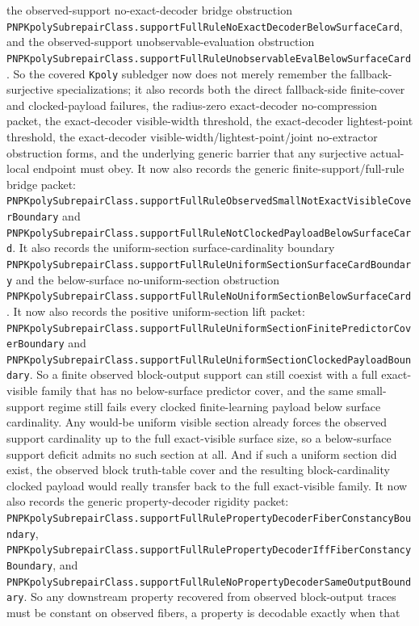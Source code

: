\documentclass[11pt]{article}
\theoremstyle{remark}
\begin{document}
the observed-support no-exact-decoder bridge obstruction
\texttt{PNPKpolySubrepairClass.supportFullRuleNoExactDecoderBelowSurfaceCard},
and the observed-support unobservable-evaluation obstruction
\texttt{PNPKpolySubrepairClass.supportFullRuleUnobservableEvalBelowSurfaceCard}.
So the covered \texttt{Kpoly} subledger now does not merely remember the
fallback-surjective specializations; it also records both the direct
fallback-side finite-cover and clocked-payload failures, the radius-zero
exact-decoder no-compression packet, the exact-decoder visible-width
threshold, the exact-decoder lightest-point threshold, the exact-decoder
visible-width/lightest-point/joint no-extractor obstruction forms, and the
underlying generic barrier that any surjective actual-local endpoint must obey.
It now also records the generic finite-support/full-rule bridge packet:
\texttt{PNPKpolySubrepairClass.supportFullRuleObservedSmallNotExactVisibleCoverBoundary}
and
\texttt{PNPKpolySubrepairClass.supportFullRuleNotClockedPayloadBelowSurfaceCard}.
It also records the uniform-section surface-cardinality boundary
\texttt{PNPKpolySubrepairClass.supportFullRuleUniformSectionSurfaceCardBoundary}
and the below-surface no-uniform-section obstruction
\texttt{PNPKpolySubrepairClass.supportFullRuleNoUniformSectionBelowSurfaceCard}.
It now also records the positive uniform-section lift packet:
\texttt{PNPKpolySubrepairClass.supportFullRuleUniformSectionFinitePredictorCoverBoundary}
and
\texttt{PNPKpolySubrepairClass.supportFullRuleUniformSectionClockedPayloadBoundary}.
So a finite observed block-output support can still coexist with a full
exact-visible family that has no below-surface predictor cover, and the same
small-support regime still fails every clocked finite-learning payload below
surface cardinality. Any would-be uniform visible section already forces the
observed support cardinality up to the full exact-visible surface size, so a
below-surface support deficit admits no such section at all. And if such a
uniform section did exist, the observed block truth-table cover and the
resulting block-cardinality clocked payload would really transfer back to the
full exact-visible family.
It now also records the generic property-decoder rigidity packet:
\texttt{PNPKpolySubrepairClass.supportFullRulePropertyDecoderFiberConstancyBoundary},
\texttt{PNPKpolySubrepairClass.supportFullRulePropertyDecoderIffFiberConstancyBoundary},
and
\texttt{PNPKpolySubrepairClass.supportFullRuleNoPropertyDecoderSameOutputBoundary}.
So any downstream property recovered from observed block-output traces must be
constant on observed fibers, a property is decodable exactly when that
\end{document}
